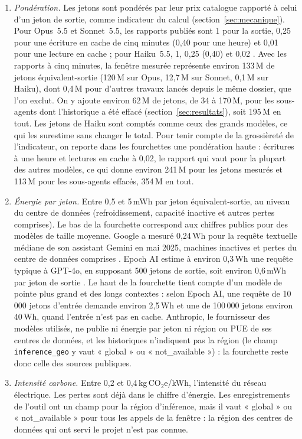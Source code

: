 \documentclass[11pt,a4paper]{article}
\newcommand{\COe}{\,kg\,CO$_2$e}
\begin{document}
\begin{enumerate}
\item \emph{Pondération.} Les jetons sont pondérés par leur prix catalogue rapporté à celui d'un jeton de sortie, comme indicateur du calcul (section~\ref{sec:mecanique}). Pour Opus~5.5 et Sonnet~5.5, les rapports publiés sont 1 pour la sortie, 0,25 pour une écriture en cache de cinq minutes (0,40 pour une heure) et 0,01 pour une lecture en cache ; pour Haiku~5.5, 1, 0,25 (0,40) et 0,02 \citep{anthropicpricing}. Avec les rapports à cinq minutes, la fenêtre mesurée représente environ 133\,M de jetons équivalent-sortie (120\,M sur Opus, 12,7\,M sur Sonnet, 0,1\,M sur Haiku), dont 0,4\,M pour d'autres travaux lancés depuis le même dossier, que l'on exclut. On y ajoute environ 62\,M de jetons, de 34 à 170\,M, pour les sous-agents dont l'historique a été effacé (section~\ref{sec:resultats}), soit 195\,M en tout. Les jetons de Haiku sont comptés comme ceux des grands modèles, ce qui les surestime sans changer le total. Pour tenir compte de la grossièreté de l'indicateur, on reporte dans les fourchettes une pondération haute : écritures à une heure et lectures en cache à 0,02, le rapport qui vaut pour la plupart des autres modèles, ce qui donne environ 241\,M pour les jetons mesurés et 113\,M pour les sous-agents effacés, 354\,M en tout.
\item \emph{Énergie par jeton.} Entre 0,5 et 5\,mWh par jeton équivalent-sortie, au niveau du centre de données (refroidissement, capacité inactive et autres pertes comprises). Le bas de la fourchette correspond aux chiffres publics pour des modèles de taille moyenne. Google a mesuré 0,24\,Wh pour la requête textuelle médiane de son assistant Gemini en mai 2025, machines inactives et pertes du centre de données comprises \citep{elsworth2025}. Epoch AI estime à environ 0,3\,Wh une requête typique à GPT-4o, en supposant 500 jetons de sortie, soit environ 0,6\,mWh par jeton de sortie \citep{you2025epoch}. Le haut de la fourchette tient compte d'un modèle de pointe plus grand et des longs contextes : selon Epoch AI, une requête de 10\,000 jetons d'entrée demande environ 2,5\,Wh et une de 100\,000 jetons environ 40\,Wh, quand l'entrée n'est pas en cache. Anthropic, le fournisseur des modèles utilisés, ne publie ni énergie par jeton ni région ou PUE de ses centres de données, et les historiques n'indiquent pas la région (le champ \texttt{inference\_geo} y vaut « global » ou « not\_available ») : la fourchette reste donc celle des sources publiques.
\item \emph{Intensité carbone.} Entre 0,2 et 0,4\COe/kWh, l'intensité du réseau électrique. Les pertes sont déjà dans le chiffre d'énergie. Les enregistrements de l'outil ont un champ pour la région d'inférence, mais il vaut « global » ou « not\_available » pour tous les appels de la fenêtre : la région des centres de données qui ont servi le projet n'est pas connue.

\end{enumerate}
\end{document}
